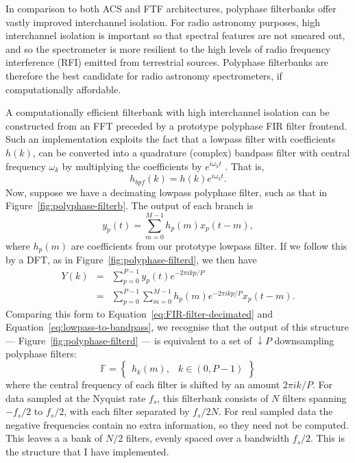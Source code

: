 \documentclass{ws-rv961x669}
\begin{document}
In comparison to both ACS and FTF architectures, polyphase filterbanks
offer vastly improved interchannel isolation. For radio astronomy
purposes, high interchannel isolation is important so that spectral
features are not smeared out, and so the spectrometer is more resilient
to the high levels of radio frequency interference (RFI) emitted from
terrestrial sources. Polyphase filterbanks are therefore the best
candidate for radio astronomy spectrometers, if computationally affordable.

A computationally efficient filterbank with high interchannel isolation
can be constructed from an FFT preceded by a prototype polyphase FIR
filter frontend. Such an implementation exploits the fact that a lowpass
filter with coefficients $h(k)$, can be converted into a quadrature
(complex) bandpass filter with central frequency $\omega_{k}$ by
multiplying the coefficients by $e^{i\omega_{k}t}$ . That is,
\begin{equation}
h_{bpf}(k)=h(k)e^{i\omega_{k}t}.\label{eq:lowpass-to-bandpass}
\end{equation}
Now, suppose we have a decimating lowpass polyphase filter, such as
that in Figure~\ref{fig:polyphase-filterb}. The output of each branch
is 
\begin{equation}
y_{p}(t)=\sum_{m=0}^{M-1}h_{p}(m)x_{p}(t-m),
\end{equation}
where $h_{p}(m)$ are coefficients from our prototype lowpass filter.
If we follow this by a DFT, as in Figure~\ref{fig:polyphase-filterd},
we then have 
\begin{eqnarray}
Y(k) & = & \sum_{p=0}^{P-1}y_{p}(t)e^{-2\pi ikp/P}\\
 & = & \sum_{p=0}^{P-1}\sum_{m=0}^{M-1}h_{p}(m)e^{-2\pi ikp/P}x_{p}(t-m).
\end{eqnarray}
Comparing this form to Equation~\ref{eq:FIR-filter-decimated} and
Equation~\ref{eq:lowpass-to-bandpass}, we recognise that the output
of this structure --- Figure~\ref{fig:polyphase-filterd} --- is
equivalent to a set of $\downarrow P$ downsampling polyphase filters:
\begin{equation}
\mathbb{F}=\begin{Bmatrix}h_{k}(m), & k\in(0,P-1)\end{Bmatrix}
\end{equation}
where the central frequency of each filter is shifted by an amount
$\mbox{2}\pi ik/P$. For data sampled at the Nyquist rate $f_{s}$,
this filterbank consists of $N$ filters spanning $-f_{s}/\mbox{2}$
to $f_{s}/\mbox{2}$, with each filter separated by $f_{s}/\mbox{2}N$.
For real sampled data the negative frequencies contain no extra information,
so they need not be computed. This leaves a a bank of $N/\mbox{2}$
filters, evenly spaced over a bandwidth $f_{s}/\mbox{2}$. This is
the structure that I have implemented.
\end{document}

